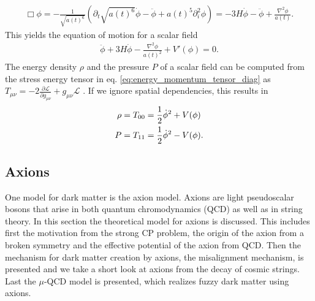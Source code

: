\documentclass[twoside,a4paper, 12pt]{article}
\numberwithin{equation}{section}
\begin{document}
\begin{align*}
    \Box \phi = - \frac{1}{\sqrt{a(t)^6}} (\partial_t \sqrt{ a(t)^6 } \dot{\phi} - \ddot{\phi} + a(t)^5 \partial_i^2 \phi)
                                     = - 3H \dot{\phi} - \ddot{\phi} + \frac{\nabla^2 \phi}{a(t)}.
\end{align*}
This yields the equation of motion for a scalar field \cite[Chap 4.2, Page 25]{MarshAxionCosmo}
\begin{align}
    \label{eq:klein_gordon}
    \ddot{\phi} + 3 H \dot{\phi} - \frac{\nabla^2 \phi}{a(t)^2} + V'(\phi) = 0.
\end{align}
The energy density $\rho$ and the pressure $P$ of a scalar field
can be computed from the stress energy tensor in eq. \eqref{eq:energy_momentum_tensor_diag} as
$T_{\mu \nu} = -2 \frac{\partial \mathcal{L}}{\partial g_{\mu \nu}} + g_{\mu \nu} \mathcal{L}$
\cite[Sec. 3.3, Page 161, Eq. 3.21]{ClassicalFieldTheory}.
If we ignore spatial dependencies, this results in \cite[Sec. 4.2, Page. 25]{MarshAxionCosmo}
\begin{align}
    \label{eq:axion_energy_density_and_pressure}
    \notag \rho &= T_{00} %
     =  \frac{1}{2} \dot{\phi}^2 + V(\phi) \\
    P &= T_{11} %
    = \frac{1}{2} \dot{\phi}^2 - V(\phi).
\end{align}

\subsection{Axions}
\label{sec:axions}
One model for dark matter is the axion model.
Axions are light pseudoscalar bosons that arise in both quantum chromodynamics (QCD)
as well as in string theory. In this section the theoretical
model for axions is discussed. This includes first the motivation from the strong CP problem, the origin of the axion from
a broken symmetry and the effective potential of the axion from QCD.
Then the mechanism for dark matter creation by axions, the misalignment mechanism, is presented
and we take a short look at axions from the decay of cosmic strings.
Last the $\mu$-QCD model is presented, which realizes fuzzy dark matter using axions.
\end{document}
